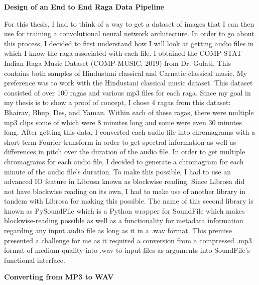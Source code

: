 \doublespacing
\setlength{\parindent}{1cm}

\begin{flushleft}
  \textbf{Design of an End to End Raga Data Pipeline}
\end{flushleft}

For this thesis, I had to think of a way to get a dataset of images that I can then use for training a convolutional neural network architecture. In order to go about this process, I decided to first understand how I will look at getting audio files in which I know the raga associated with each file. I obtained the COMP-STAT Indian Raga Music Dataset (COMP-MUSIC, 2019) from Dr. Gulati. This contains both samples of Hindustani classical and Carnatic classical music. My preference was to work with the Hindustani classical music dataset. This dataset consisted of over 100 ragas and various mp3 files for each raga. Since my goal in my thesis is to show a proof of concept, I chose 4 ragas from this dataset: Bhairav, Bhup, Des, and Yaman. Within each of these ragas, there were multiple mp3 clips some of which were 8 minutes long and some were even 30 minutes long. After getting this data, I converted each audio file into chromagrams with a short term Fourier transform in order to get spectral information as well as differences in pitch over the duration of the audio file. In order to get multiple chromagrams for each audio file, I decided to generate a chromagram for each minute of the audio file's duration. To make this possible, I had to use an advanced I\/O feature in Librosa known as blockwise reading. Since Librosa did not have blockwise reading on its own, I had to make use of another library in tandem with Librosa for making this possible. The name of this second library is known as PySoundFile which is a Python wrapper for SoundFile which makes blockwise-reading possible as well as a functionality for metadata information regarding any input audio file as long as it in a .wav format. This premise presented a challenge for me as it required a conversion from a compressed .mp3 format of medium quality into .wav to input files as arguments into SoundFile's functional interface.

\begin{flushleft}
  \textbf{Converting from MP3 to WAV}
\end{flushleft}

